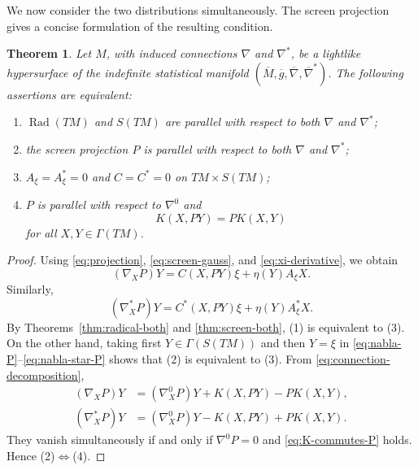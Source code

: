 \documentclass[11pt,a4paper]{article}
\newtheorem{theorem}{Theorem}[section]
\theoremstyle{remark}
\theoremstyle{definition}
\newcommand{\Rad}{\operatorname{Rad}}
\begin{document}
We now consider the two distributions simultaneously. The screen
projection gives a concise formulation of the resulting condition.

\begin{theorem}\label{thm:both-distributions}
Let $M$, with induced connections $\nabla$ and $\nabla^{*}$, be a lightlike
hypersurface of the indefinite statistical manifold
$(\overline{M},\overline{g},\overline{\nabla},\overline{\nabla}^{*})$.
The following assertions are equivalent:
\begin{enumerate}
\item $\Rad(TM)$ and $S(TM)$ are parallel with respect to both
$\nabla$ and $\nabla^{*}$;
\item the screen projection $P$ is parallel with respect to both
$\nabla$ and $\nabla^{*}$;
\item $A_{\xi}=A_{\xi}^{*}=0$ and $C=C^{*}=0$ on
$TM\times S(TM)$;
\item $P$ is parallel with respect to $\nabla^{0}$ and
\begin{equation}\label{eq:K-commutes-P}
K(X,PY)=P K(X,Y)
\end{equation}
for all $X,Y\in\Gamma(TM)$.
\end{enumerate}
\end{theorem}

\begin{proof}
Using \eqref{eq:projection}, \eqref{eq:screen-gauss}, and
\eqref{eq:xi-derivative}, we obtain
\begin{equation}\label{eq:nabla-P}
(\nabla_XP)Y=C(X,PY)\xi+\eta(Y)A_{\xi}X.
\end{equation}
Similarly,
\begin{equation}\label{eq:nabla-star-P}
(\nabla_X^{*}P)Y=C^{*}(X,PY)\xi+\eta(Y)A_{\xi}^{*}X.
\end{equation}
By Theorems~\ref{thm:radical-both} and \ref{thm:screen-both},
(1) is equivalent to (3). On the other hand, taking first
$Y\in\Gamma(S(TM))$ and then $Y=\xi$ in
\eqref{eq:nabla-P}--\eqref{eq:nabla-star-P} shows that (2) is
equivalent to (3). From \eqref{eq:connection-decomposition},
\begin{align*}
(\nabla_XP)Y
&=(\nabla_X^{0}P)Y+K(X,PY)-P K(X,Y),\\
(\nabla_X^{*}P)Y
&=(\nabla_X^{0}P)Y-K(X,PY)+P K(X,Y).
\end{align*}
They vanish simultaneously if and only if $\nabla^{0}P=0$ and
\eqref{eq:K-commutes-P} holds. Hence (2)$\Leftrightarrow$(4).
\end{proof}
\end{document}
